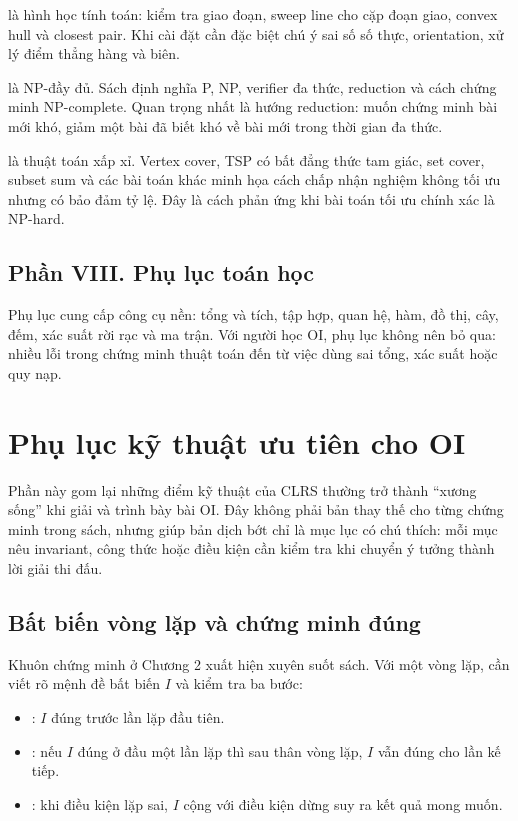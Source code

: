 \documentclass[11pt]{article}
\begin{document}
 là hình học tính toán: kiểm tra giao đoạn, sweep line cho cặp
đoạn giao, convex hull và closest pair. Khi cài đặt cần đặc biệt chú ý sai số số
thực, orientation, xử lý điểm thẳng hàng và biên.

 là NP-đầy đủ. Sách định nghĩa P, NP, verifier đa thức, reduction
và cách chứng minh NP-complete. Quan trọng nhất là hướng reduction: muốn chứng
minh bài mới khó, giảm một bài đã biết khó về bài mới trong thời gian đa thức.

 là thuật toán xấp xỉ. Vertex cover, TSP có bất đẳng thức tam
giác, set cover, subset sum và các bài toán khác minh họa cách chấp nhận nghiệm
không tối ưu nhưng có bảo đảm tỷ lệ. Đây là cách phản ứng khi bài toán tối ưu
chính xác là NP-hard.

\subsection*{Phần VIII. Phụ lục toán học}

Phụ lục cung cấp công cụ nền: tổng và tích, tập hợp, quan hệ, hàm, đồ thị, cây,
đếm, xác suất rời rạc và ma trận. Với người học OI, phụ lục không nên bỏ qua:
nhiều lỗi trong chứng minh thuật toán đến từ việc dùng sai tổng, xác suất hoặc
quy nạp.

\section{Phụ lục kỹ thuật ưu tiên cho OI}

Phần này gom lại những điểm kỹ thuật của CLRS thường trở thành ``xương sống''
khi giải và trình bày bài OI. Đây không phải bản thay thế cho từng chứng minh
trong sách, nhưng giúp bản dịch bớt chỉ là mục lục có chú thích: mỗi mục nêu
invariant, công thức hoặc điều kiện cần kiểm tra khi chuyển ý tưởng thành lời
giải thi đấu.

\subsection{Bất biến vòng lặp và chứng minh đúng}

Khuôn chứng minh ở Chương 2 xuất hiện xuyên suốt sách. Với một vòng lặp, cần
viết rõ mệnh đề bất biến \(I\) và kiểm tra ba bước:
\begin{itemize}
  \item {}: \(I\) đúng trước lần lặp đầu tiên.
  \item {}: nếu \(I\) đúng ở đầu một lần lặp thì sau thân vòng lặp,
        \(I\) vẫn đúng cho lần kế tiếp.
  \item {}: khi điều kiện lặp sai, \(I\) cộng với điều kiện dừng
        suy ra kết quả mong muốn.
\end{itemize}
\end{document}
